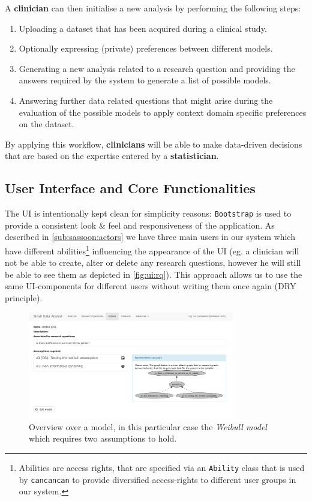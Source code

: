 \bigskip

A \textbf{clinician} can then initialise a new analysis by performing the following steps:
 
\begin{enumerate}
	\item Uploading a dataset that has been acquired during a clinical study.
	\item Optionally expressing (private) preferences between different models.
	\item Generating a new analysis related to a research question and providing the answers required by the system to generate a list of possible models.
	\item Answering further data related questions that might arise during the evaluation of the possible models to apply context domain specific preferences on the dataset.
\end{enumerate}
\bigskip

By applying this workflow, \textbf{clinicians} will be able to make data-driven decisions that are based on the expertise entered by a \textbf{statistician}.


\subsection{User Interface and Core Functionalities}
\label{sub:ui}

The \gls{UI} is intentionally kept clean for simplicity reasons: \texttt{Bootstrap} is used to provide a consistent look \& feel and responsiveness of the application. As described in \autoref{sub:sassoon:actors} we have three main users in our system which have different abilities\footnote{Abilities are access rights, that are specified via an \texttt{Ability} class that is used by \texttt{cancancan} to provide diversified access-rights to different user groups in our system.} influencing the appearance of the \gls{UI} (eg. a clinician will not be able to create, alter or delete any research questions, however he will still be able to see them as depicted in \autoref{fig:ui:rq}). This approach allows us to use the same \gls{UI}-components for different users without writing them once again (\gls{DRY} principle).

\begin{figure}[h]
\centering
\includegraphics[width=0.8\textwidth]{figures/ui_Weibull_Model}
\caption{Overview over a model, in this particular case the \textit{Weibull model} which requires two assumptions to hold.}
\label{fig:ui:model}
\end{figure}


